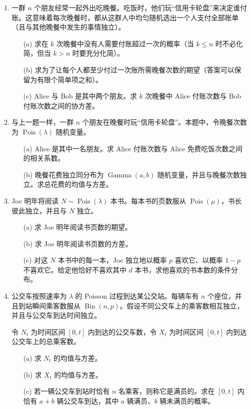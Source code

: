 \documentclass[UTF8, 12pt, fontset=fandol, oneside]{ctexart}
\begin{document}
\begin{enumerate}
  \item 一群 $n$ 个朋友经常一起外出吃晚餐。吃饭时，他们玩“信用卡轮盘”来决定谁付账。这意味着每次晚餐时，都从这群人中均匀随机选出一个人支付全部账单（且与其他晚餐中发生的事情独立）。
  \begin{enumerate}
    \item[(a)] 求在 $k$ 次晚餐中没有人需要付账超过一次的概率（当 $k\le n$ 时不必化简，但当 $k>n$ 时要充分化简）。
    \item[(b)] 求为了让每个人都至少付过一次账所需晚餐次数的期望（答案可以保留为有限个简单项之和）。
    \item[(c)] Alice 与 Bob 是其中两个朋友。求 $k$ 次晚餐中 Alice 付账次数与 Bob 付账次数之间的协方差。
  \end{enumerate}

  \item 与上一题一样，一群 $n$ 个朋友在晚餐时玩“信用卡轮盘”。本题中，令晚餐次数为 $\operatorname{Pois}(\lambda)$ 随机变量。
  \begin{enumerate}
    \item[(a)] Alice 是其中一名朋友。求 Alice 付账次数与 Alice 免费吃饭次数之间的相关系数。
    \item[(b)] 晚餐花费独立同分布为 $\operatorname{Gamma}(a,b)$ 随机变量，并且与晚餐次数独立。求总花费的均值与方差。
  \end{enumerate}

  \item Joe 明年将阅读 $N\sim\operatorname{Pois}(\lambda)$ 本书。每本书的页数服从 $\operatorname{Pois}(\mu)$，书长彼此独立，并且与 $N$ 独立。
  \begin{enumerate}
    \item[(a)] 求 Joe 明年阅读书页数的期望。
    \item[(b)] 求 Joe 明年阅读书页数的方差。
    \item[(c)] 对这 $N$ 本书中的每一本，Joe 独立地以概率 $p$ 喜欢它、以概率 $1-p$ 不喜欢它。给定他恰好不喜欢其中 $d$ 本书，求他喜欢的书本数的条件分布。
  \end{enumerate}

  \item 公交车按照速率为 $\lambda$ 的 Poisson 过程到达某公交站。每辆车有 $n$ 个座位，并且到站瞬间乘客数服从 $\operatorname{Bin}(n,p)$。假设不同公交车上的乘客数相互独立，并且与公交车到达时间独立。

  令 $N_t$ 为时间区间 $[0,t]$ 内到达的公交车数，令 $X_t$ 为时间区间 $[0,t]$ 内到达公交车上的总乘客数。
  \begin{enumerate}
    \item[(a)] 求 $N_t$ 的均值与方差。
    \item[(b)] 求 $X_t$ 的均值与方差。
    \item[(c)] 若一辆公交车到站时恰有 $n$ 名乘客，则称它是满员的。求在 $[0,t]$ 内恰有 $a+b$ 辆公交车到达，其中 $a$ 辆满员、$b$ 辆未满员的概率。
  \end{enumerate}


\end{enumerate}
\end{document}
